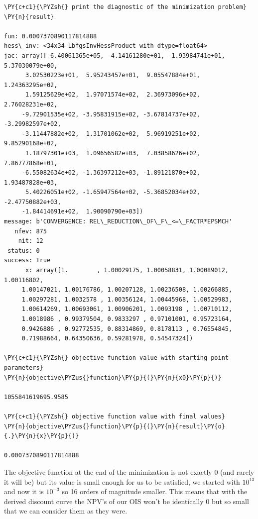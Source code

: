 \begin{tcolorbox}[breakable, size=fbox, boxrule=1pt, pad at break*=1mm,colback=cellbackground, colframe=cellborder]
\begin{Verbatim}[commandchars=\\\{\}]
\PY{c+c1}{\PYZsh{} print the diagnostic of the minimization problem}
\PY{n}{result}

fun: 0.0007370890117814888
hess\_inv: <34x34 LbfgsInvHessProduct with dtype=float64>
jac: array([ 6.40061365e+05, -4.14161280e+01, -1.93984741e+01,  5.37030079e+00,
      3.02530223e+01,  5.95243457e+01,  9.05547884e+01,  1.24363295e+02,
      1.59125629e+02,  1.97071574e+02,  2.36973096e+02,  2.76028231e+02,
     -9.72901535e+02, -3.95831915e+02, -3.67814737e+02, -3.29982597e+02,
     -3.11447882e+02,  1.31701062e+02,  5.96919251e+02,  9.85290168e+02,
      1.18797301e+03,  1.09656582e+03,  7.03858626e+02,  7.86777868e+01,
     -6.55082634e+02, -1.36397212e+03, -1.89121870e+02,  1.93487828e+03,
      5.40226051e+02, -1.65947564e+02, -5.36852034e+02, -2.47750882e+03,
     -1.84414691e+02,  1.90090790e+03])
message: b'CONVERGENCE: REL\_REDUCTION\_OF\_F\_<=\_FACTR*EPSMCH'
   nfev: 875
    nit: 12
 status: 0
success: True
      x: array([1.        , 1.00029175, 1.00058831, 1.00089012, 1.00116802,
     1.00147021, 1.00176786, 1.00207128, 1.00236508, 1.00266885,
     1.00297281, 1.0032578 , 1.00356124, 1.00445968, 1.00529983,
     1.00614269, 1.00693061, 1.00906201, 1.0093198 , 1.00710112,
     1.0018986 , 0.99379504, 0.9833297 , 0.97101001, 0.95723164,
     0.9426886 , 0.92772535, 0.88314869, 0.8178113 , 0.76554845,
     0.71988664, 0.64350636, 0.59281978, 0.54547324])

\PY{c+c1}{\PYZsh{} objective function value with starting point parameters}
\PY{n}{objective\PYZus{}function}\PY{p}{(}\PY{n}{x0}\PY{p}{)} 

1055841619695.9585

\PY{c+c1}{\PYZsh{} objective function value with final values}
\PY{n}{objective\PYZus{}function}\PY{p}{(}\PY{n}{result}\PY{o}{.}\PY{n}{x}\PY{p}{)} 

0.0007370890117814888
\end{Verbatim}
\end{tcolorbox}

The objective function at the end of the minimization is not exactly 0 (and rarely it will be) but its value is small enough for us to be satisfied, we started with $10^{13}$ and now it is $10^{-3}$ so 16 orders of magnitude smaller. This means that with the derived discount curve the NPV's of our OIS won't be identically 0 but so small that we can consider them as they were.

